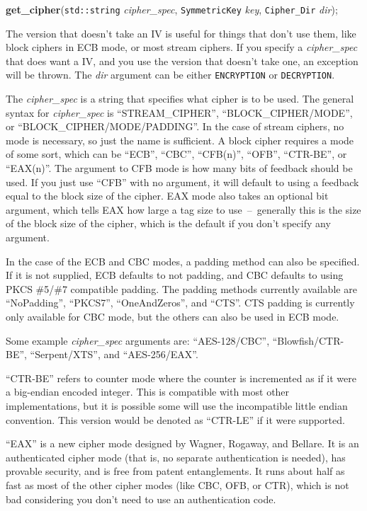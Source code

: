 \documentclass{article}
\newcommand{\function}[1]{\textbf{#1}}
\newcommand{\type}[1]{\texttt{#1}}
\renewcommand{\arg}[1]{\textsl{#1}}
\begin{document}
\function{get\_cipher}(\type{std::string} \arg{cipher\_spec},
                       \type{SymmetricKey} \arg{key},
                       \type{Cipher\_Dir} \arg{dir});

The version that doesn't take an IV is useful for things that don't
use them, like block ciphers in ECB mode, or most stream ciphers. If
you specify a \arg{cipher\_spec} that does want a IV, and you use the
version that doesn't take one, an exception will be thrown. The
\arg{dir} argument can be either \type{ENCRYPTION} or
\type{DECRYPTION}.

The \arg{cipher\_spec} is a string that specifies what cipher is to be
used. The general syntax for \arg{cipher\_spec} is ``STREAM\_CIPHER'',
``BLOCK\_CIPHER/MODE'', or ``BLOCK\_CIPHER/MODE/PADDING''. In the case
of stream ciphers, no mode is necessary, so just the name is
sufficient. A block cipher requires a mode of some sort, which can be
``ECB'', ``CBC'', ``CFB(n)'', ``OFB'', ``CTR-BE'', or ``EAX(n)''. The
argument to CFB mode is how many bits of feedback should be used. If
you just use ``CFB'' with no argument, it will default to using a
feedback equal to the block size of the cipher. EAX mode also takes an
optional bit argument, which tells EAX how large a tag size to
use~--~generally this is the size of the block size of the cipher,
which is the default if you don't specify any argument.

In the case of the ECB and CBC modes, a padding method can also be
specified. If it is not supplied, ECB defaults to not padding, and CBC
defaults to using PKCS \#5/\#7 compatible padding. The padding methods
currently available are ``NoPadding'', ``PKCS7'', ``OneAndZeros'', and
``CTS''. CTS padding is currently only available for CBC mode, but the
others can also be used in ECB mode.

Some example \arg{cipher\_spec} arguments are: ``AES-128/CBC'',
``Blowfish/CTR-BE'', ``Serpent/XTS'', and ``AES-256/EAX''.

``CTR-BE'' refers to counter mode where the counter is incremented as
if it were a big-endian encoded integer. This is compatible with most
other implementations, but it is possible some will use the
incompatible little endian convention. This version would be denoted
as ``CTR-LE'' if it were supported.

``EAX'' is a new cipher mode designed by Wagner, Rogaway, and
Bellare. It is an authenticated cipher mode (that is, no separate
authentication is needed), has provable security, and is free from
patent entanglements. It runs about half as fast as most of the other
cipher modes (like CBC, OFB, or CTR), which is not bad considering you
don't need to use an authentication code.
\end{document}

